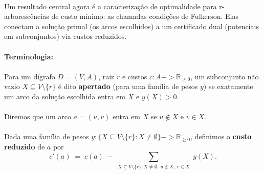 \documentclass[12pt,a4paper]{article}
\def\\{}%
\def\emph#1{#1}%
\def\to{->}%
\begin{document}
\paragraph{}
Um resultado central agora é a caracterização de \emph{optimalidade} para r-arborescências de custo mínimo: as chamadas \emph{condições de Fulkerson}. Elas conectam a solução primal (os arcos escolhidos) a um certificado dual (potenciais em subconjuntos) via custos reduzidos.

\paragraph{Terminologia:} 
\paragraph{}
Para um dígrafo $D=(V,A)$, raiz $r$ e custos $c:A\to \mathbb{R}_{\ge 0}$, um subconjunto não vazio $X\subseteq V\setminus\{r\}$ é dito \textbf{apertado} (para uma família de pesos $y$) se exatamente um arco da solução escolhida entra em $X$ e $y(X)>0$. 

\paragraph{}
Diremos que um arco $a=(u,v)$ \emph{entra} em $X$ se $u\notin X$ e $v\in X$. 

\paragraph{}
Dada uma família de pesos $y: \{X\subseteq V\setminus\{r\}: X\neq\emptyset\}\to \mathbb{R}_{\ge 0}$, definimos o \textbf{custo reduzido} de $a$ por
\[
 c'(a) \;=\; c(a)\; - \sum_{\substack{X\subseteq V\setminus\{r\},\\ X\neq\emptyset,\ u\notin X,\ v\in X}} y(X).
\]
\end{document}
